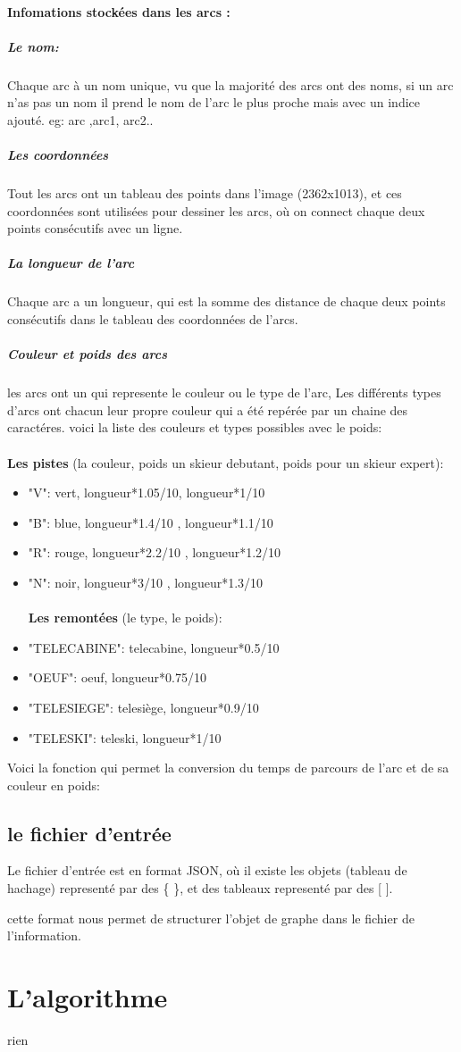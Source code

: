 \documentclass{article}
\begin{document}
			\paragraph{Infomations stock\'ees dans les arcs :}\subparagraph{Le nom:}Chaque arc \`a un nom unique, vu que la majorit\'e des arcs ont des noms, si un arc n'as pas un nom il prend le nom de l'arc le plus proche mais avec un indice ajout\'e. eg: arc ,arc1, arc2..
			\subparagraph{Les coordonn\'ees}Tout les arcs ont un tableau des points dans l'image (2362x1013), et ces coordonn\'ees sont utilis\'ees pour dessiner les arcs, o\`u on connect chaque deux points cons\'ecutifs  avec un ligne.
			\subparagraph{La longueur de l'arc}
			Chaque arc a un longueur, qui est la somme des distance de chaque deux points cons\'ecutifs dans le tableau des coordonn\'ees de l'arcs.
			\subparagraph{Couleur et poids des arcs}
			les arcs ont un  qui represente le couleur ou le type de l'arc, 
			Les diff\'erents types d'arcs ont chacun leur propre couleur qui a \'et\'e rep\'er\'ee par un chaine des caractéres. voici la liste des couleurs et types possibles avec le poids:\\\\
			\textbf{Les pistes} (la couleur, poids un skieur debutant, poids pour un skieur expert):
			\begin{itemize}
			\item{"V": vert,  longueur*1.05/10, longueur*1/10}
			\item{"B": blue,  longueur*1.4/10 , longueur*1.1/10}
			\item{"R": rouge, longueur*2.2/10 , longueur*1.2/10}
			\item{"N": noir,  longueur*3/10   , longueur*1.3/10}\\\\
			\textbf{Les remont\'ees} (le type, le poids):
			\item{"TELECABINE": telecabine, longueur*0.5/10}
			\item{"OEUF": oeuf, longueur*0.75/10}
			\item{"TELESIEGE": telesi\`ege, longueur*0.9/10}
			\item{"TELESKI": teleski, longueur*1/10}
			\end{itemize}

			Voici la fonction qui permet la conversion du temps de parcours de l'arc et de sa couleur en poids:
	

\subsection{le fichier d'entr\'ee}
Le fichier d'entr\'ee est en format JSON, o\`u il existe les objets (tableau de hachage) represent\'e par des \{ \}, et des tableaux represent\'e par des [ ].


cette format nous permet de structurer l'objet de graphe dans le fichier de l'information.
\section{L'algorithme}
rien
\end{document}
